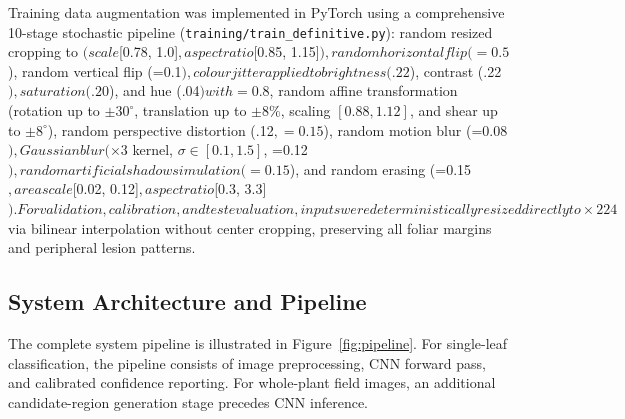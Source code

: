 \documentclass[pdflatex,sn-mathphys-num]{sn-jnl}
\theoremstyle{thmstyleone}%
\theoremstyle{thmstyletwo}%
\theoremstyle{thmstylethree}%
\begin{document}
\noindent Training data augmentation was implemented in PyTorch using a comprehensive 10-stage stochastic pipeline (\texttt{training/train\_definitive.py}):
random resized cropping to  $ (scale $[0.78, 1.0]$, aspect ratio $[0.85, 1.15]$),
random horizontal flip (=0.5$),
random vertical flip (=0.1$),
colour jitter applied to brightness (.22$), contrast (.22$), saturation (.20$), and hue (.04$) with =0.8$,
random affine transformation (rotation up to $\pm 30^\circ$, translation up to $\pm 8\%$, scaling $[0.88, 1.12]$, and shear up to $\pm 8^\circ$),
random perspective distortion (.12$, =0.15$),
random motion blur (=0.08$),
Gaussian blur (\times3$ kernel, $\sigma \in [0.1, 1.5]$, =0.12$),
random artificial shadow simulation (=0.15$), and
random erasing (=0.15$, area scale $[0.02, 0.12]$, aspect ratio $[0.3, 3.3]$).
For validation, calibration, and test evaluation, inputs were deterministically resized directly to  \times 224$ via bilinear interpolation without center cropping, preserving all foliar margins and peripheral lesion patterns.

\subsection{System Architecture and Pipeline}
\label{sec:system_pipeline}

The complete system pipeline is illustrated in Figure~\ref{fig:pipeline}. For single-leaf
classification, the pipeline consists of image preprocessing, CNN forward pass, and
calibrated confidence reporting. For whole-plant field images, an additional candidate-region
generation stage precedes CNN inference.
\end{document}
